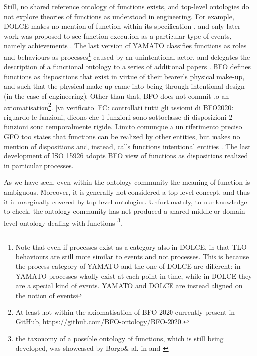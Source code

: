 \documentclass[sw]{iosart2x}
\newcommand{\DOLCE}{\textsc{DOLCE}\xspace} %
\newcommand{\YAMATO}{\textsc{YAMATO}\xspace}
\newcommand{\BFO}{\textsc{BFO}\xspace}
\newcommand{\GFO}{\textsc{GFO}\xspace}
\newcommand{\TLO}{\textnormal{TLO}\xspace}
\newcommand{\quotes}[1]{`#1'}
\newcommand{\TODO}[1]{{\color{red} #1}}
\begin{document}
Still, no shared reference ontology of functions exists, and top-level ontologies do not explore theories of functions as understood in engineering. 
For example, \DOLCE makes no mention of function within its specification \cite{masoloWonderWebDeliverableD182003}, and only later work was proposed to see function execution as a particular type of events, namely achievements \cite{borgoCapabilitiesCapacitiesFunctionalities2021}. 
The last version of \YAMATO classifies functions as roles and behaviours as processes\footnote{Note that even if processes exist as a category also in \DOLCE, in that \TLO behaviours are still more similar to events and not processes. This is because the process category of \YAMATO and the one of \DOLCE are different: in \YAMATO processes wholly exist at each point in time, while in \DOLCE they are a special kind of events. \YAMATO  and \DOLCE are instead aligned on the notion of events %
} 
caused by an unintentional actor, and delegates the description of a functional ontology to a series of additional papers \cite{kitamuraOntologicalModelDevice2006, kitamuraCharacterizingFunctionsBased2013, mizoguchiFunctionalOntologyArtifacts2009}. 
\BFO defines functions as dispositions %
that exist in virtue of their bearer's physical make-up, and such that the physical make-up came into being through intentional design (in the case of engineering). Other than that, \BFO does not commit to an axiomatisation\footnote{At least not within the axiomatisation of BFO 2020 currently present in GitHub, \url{https://github.com/BFO-ontology/BFO-2020}.}.\TODO{[va verificato][FC: controllati tutti gli assiomi di BFO2020: riguardo le funzioni, dicono che 1-funzioni sono sottoclasse di disposizioni 2-funzioni sono temporalmente rigide. Limito comunque a un riferimento preciso]}
\GFO too states that functions can be realized by other entities, but makes no mention of dispositions and, instead, calls functions intentional entities \cite{herreGeneralFormalOntology2006}.
The last development of ISO 15926 \cite{kluwerISO159261420202020} adopts \BFO view of functions as dispositions realized in particular processes.

As we have seen, even within the ontology community the meaning of function is ambiguous. 
Moreover, it is generally not considered a top-level concept, and thus it is marginally covered by top-level ontologies. 
Unfortunately, to our knowledge \TODO{to check}, the ontology community has not produced a shared middle or domain level ontology dealing with functions \footnote{the taxonomy of a possible ontology of functions, which is still being developed, was showcased by Borgo\& al. in \cite{borgoCapabilitiesCapacitiesFunctionalities2021} and \cite{borgoKnowledgebasedAdaptiveAgents2019}}. 
\end{document}
